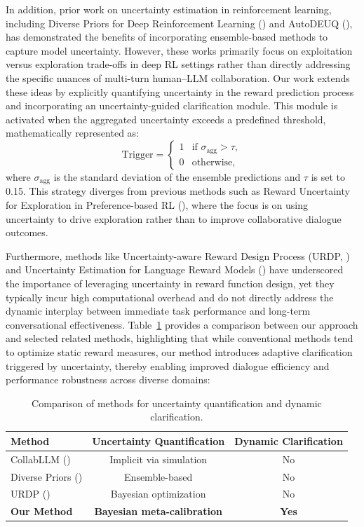 \documentclass{article} %
\begin{document}
In addition, prior work on uncertainty estimation in reinforcement learning, including Diverse Priors for Deep Reinforcement Learning (\cite{weng2023diverse}) and AutoDEUQ (\cite{egele2021autodeuq}), has demonstrated the benefits of incorporating ensemble-based methods to capture model uncertainty. However, these works primarily focus on exploitation versus exploration trade-offs in deep RL settings rather than directly addressing the specific nuances of multi-turn human–LLM collaboration. Our work extends these ideas by explicitly quantifying uncertainty in the reward prediction process and incorporating an uncertainty-guided clarification module. This module is activated when the aggregated uncertainty exceeds a predefined threshold, mathematically represented as:
\[
\text{Trigger} = \begin{cases} 
1 & \text{if } \sigma_{\text{agg}} > \tau, \\
0 & \text{otherwise,}
\end{cases}
\]
where \(\sigma_{\text{agg}}\) is the standard deviation of the ensemble predictions and \(\tau\) is set to 0.15. This strategy diverges from previous methods such as Reward Uncertainty for Exploration in Preference-based RL (\cite{liang2022reward}), where the focus is on using uncertainty to drive exploration rather than to improve collaborative dialogue outcomes.

Furthermore, methods like Uncertainty-aware Reward Design Process (URDP,  \cite{yang2025uncertaintyaware}) and Uncertainty Estimation for Language Reward Models (\cite{gleave2022uncertainty}) have underscored the importance of leveraging uncertainty in reward function design, yet they typically incur high computational overhead and do not directly address the dynamic interplay between immediate task performance and long-term conversational effectiveness. Table~\ref{tab:comp} provides a comparison between our approach and selected related methods, highlighting that while conventional methods tend to optimize static reward measures, our method introduces adaptive clarification triggered by uncertainty, thereby enabling improved dialogue efficiency and performance robustness across diverse domains:

\begin{table}[h]
\centering
\begin{tabularx}{\textwidth}{|X|c|c|}
\hline
\textbf{Method} & \textbf{Uncertainty Quantification} & \textbf{Dynamic Clarification} \\
\hline
CollabLLM (\cite{wu2025collabllm}) & Implicit via simulation & No \\
\hline
Diverse Priors (\cite{weng2023diverse}) & Ensemble-based & No \\
\hline
URDP (\cite{yang2025uncertaintyaware}) & Bayesian optimization & No \\
\hline
\textbf{Our Method} & \textbf{Bayesian meta-calibration} & \textbf{Yes} \\
\hline
\end{tabularx}
\caption{Comparison of methods for uncertainty quantification and dynamic clarification.}
\label{tab:comp}
\end{table}
\end{document}

